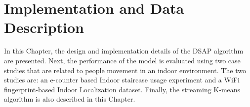 \setlength{\parindent}{2em}










% 

\chapter{Implementation and Data Description}

In this Chapter, the design and implementation details of the DSAP algorithm are presented. Next, the performance of the model is evaluated using two case studies that are related to people movement in an indoor environment. The two studies are: an e-counter based Indoor staircase usage experiment and a WiFi fingerprint-based Indoor Localization dataset. Finally, the streaming K-means algorithm is also described in this Chapter.








